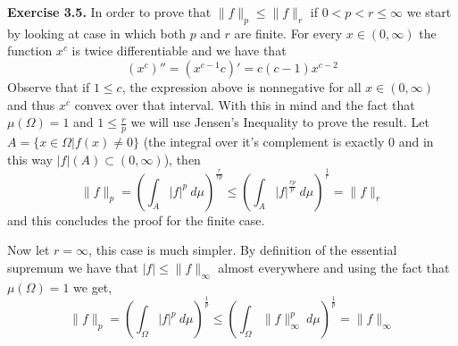 \documentclass{article}
\begin{document}
\begin{exercise}\textbf{Exercise 3.5.}
    In order to prove that $ \|f\|_p \le \|f\|_r$ if $0 < p < r \le \infty$ we start by looking at case in which both $p$ and $r$ are finite. For every $x \in \left( 0,\infty \right) $ the function $x^{c}$ is twice differentiable and we have that
    \[
        \left( x^c \right)'' = \left( x^{c-1}c \right) ' = c \left( c-1 \right) x^{c-2}
    \]
    Observe that if $1 \le c$, the expression above is nonnegative for all $x \in \left( 0,\infty \right)$ and thus $x^c$ convex over that interval. With this in mind and the fact that $\mu \left( \Omega \right) = 1$ and $1 \le \frac{r}{p}$ we will use Jensen's Inequality to prove the result. Let $A = \{x \in \Omega | f \left( x \right) \neq 0 \}$ (the integral over it's complement is exactly $0$ and in this way $|f| \left( A \right) \subset \left( 0,\infty \right)$), then  
    \[
        \|f\|_p = \left( \int_A |f|^p\: d\mu  \right)^{\frac{r}{rp}} \le \left( \int_A |f|^{\frac{rp}{p}}\: d\mu  \right)^\frac{1}{r} = \|f\|_r 
    \]
    and this concludes the proof for the finite case.

    Now let $r = \infty$, this case is much simpler. By definition of the essential supremum we have that $|f| \le \|f\|_\infty $ almost everywhere and using the fact that $\mu \left( \Omega \right) = 1$ we get,
    \[
        \|f\|_p = \left( \int_\Omega |f|^p\: d\mu  \right)^\frac{1}{p} \le \left( \int_\Omega \|f\|_\infty^p \: d\mu  \right) ^\frac{1}{p} = \|f\|_\infty 
    \]
    
\end{exercise}

\bigbreak
\end{document}
